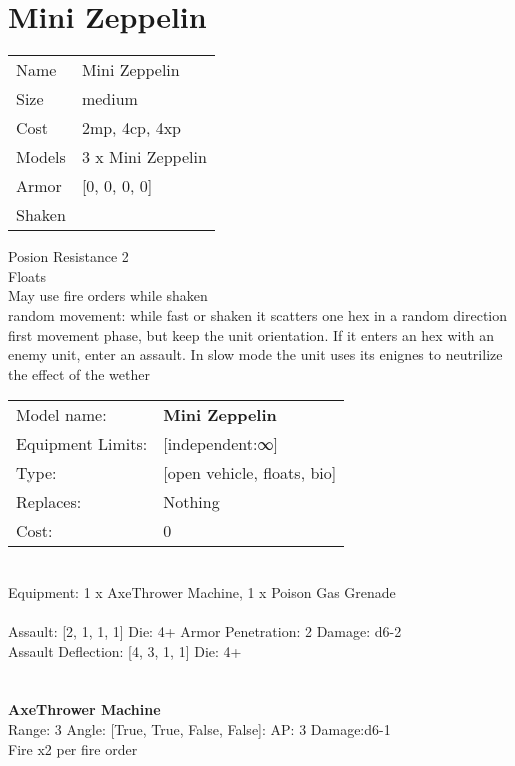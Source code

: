 \pagebreak\pagebreak

\section{ Mini Zeppelin }

\begin{tabular}{ll}
  Name & Mini Zeppelin \\
  Size & medium\\
  Cost & 2mp, 4cp, 4xp\\
  Models & 3 x Mini Zeppelin\\
  Armor & [0, 0, 0, 0]\\
  Shaken & \\
\end{tabular}

\noindent Posion Resistance 2\\ 
Floats\\ 
May use fire orders while shaken\\ 
random movement: while fast or shaken it scatters one hex in a random direction first movement phase, but keep the unit orientation. If it enters an hex with an enemy unit, enter an assault. In slow mode the unit uses its enignes to neutrilize the effect of the wether\\ 


\noindent
\begin{tabular}{ll}
Model name: &{\bf Mini Zeppelin } \\
Equipment Limits: &[independent:∞] \\
Type: &[open vehicle, floats, bio] \\
Replaces: &Nothing \\
Cost: & 0\\
\end{tabular}
\ \\
Equipment: 1 x AxeThrower Machine, 1 x Poison Gas Grenade \\
\ \\
Assault: [2, 1, 1, 1] Die: 4+ Armor Penetration: 2 Damage: d6-2 \\
Assault Deflection: [4, 3, 1, 1] Die: 4+\\
\indent  
\ \\

\ \\
{\bf AxeThrower Machine } \\



Range: 3  Angle: [True, True, False, False]: AP: 3 Damage:d6-1 \\
Fire x2 per fire order\\ 




